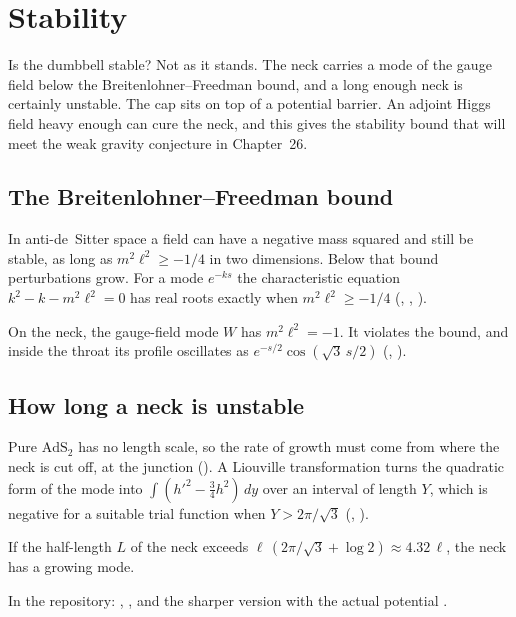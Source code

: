 \chapter{Stability}\label{ch:stability}

\begin{questionbox}
Is the dumbbell stable? Not as it stands. The neck carries a mode of the gauge field below the Breitenlohner--Freedman bound, and a long enough neck is certainly unstable. The cap sits on top of a potential barrier. An adjoint Higgs field heavy enough can cure the neck, and this gives the stability bound that will meet the weak gravity conjecture in Chapter~26.
\end{questionbox}

\section{The Breitenlohner--Freedman bound}

In anti-de~Sitter space a field can have a negative mass squared and still be stable, as long as $m^2\ell^2\ge-1/4$ in two dimensions. Below that bound perturbations grow. For a mode $e^{-ks}$ the characteristic equation $k^2-k-m^2\ell^2=0$ has real roots exactly when $m^2\ell^2\ge-1/4$ (, , ).

On the neck, the gauge-field mode $W$ has $m^2\ell^2=-1$. It violates the bound, and inside the throat its profile oscillates as $e^{-s/2}\cos(\sqrt3\,s/2)$ (, ).

\section{How long a neck is unstable}

Pure $\mathrm{AdS}_2$ has no length scale, so the rate of growth must come from where the neck is cut off, at the junction (). A Liouville transformation turns the quadratic form of the mode into $\int(h'^2-\tfrac34h^2)\,dy$ over an interval of length $Y$, which is negative for a suitable trial function when $Y>2\pi/\sqrt3$ (, ).

\begin{theorem}\proved
If the half-length $L$ of the neck exceeds $\ell\,(2\pi/\sqrt3+\log2)\approx4.32\,\ell$, the neck has a growing mode.
\end{theorem}
\noindent In the repository: , , and the sharper version with the actual potential .

